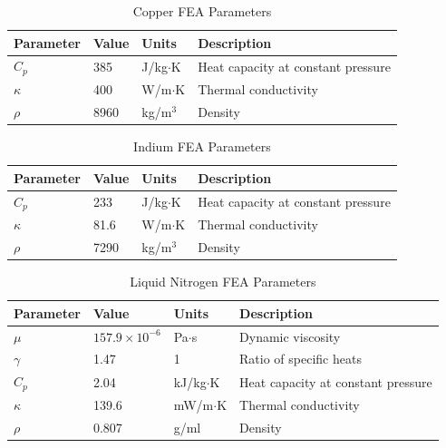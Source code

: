 \documentclass[preprint]{iucr}              %
\begin{document}
\begin{table}

\caption{Copper FEA Parameters}
\begin{tabular}{@{}llll@{}}
Parameter    & Value                  & Units                      & Description                        \\
\hline
$C_p$        & 385                    & J/kg$\cdot$K               & Heat capacity at constant pressure \\
$\kappa$     & 400                    & W/m$\cdot$K                & Thermal conductivity               \\ 
$\rho$       & 8960                   & kg/m$^3$                   & Density                            \\
\end{tabular}
\label{copperFEA}
\end{table}


\begin{table}
\caption{Indium FEA Parameters}
\begin{tabular}{@{}llll@{}}
Parameter    & Value                  & Units                      & Description                        \\
\hline
$C_p$        & 233                    & J/kg$\cdot$K               & Heat capacity at constant pressure \\
$\kappa$     & 81.6                   & W/m$\cdot$K                & Thermal conductivity               \\
$\rho$       & 7290                   & kg/m$^3$                   & Density                            \\
\end{tabular}
\label{indiumFEA}
\end{table}


\begin{table}
\caption{Liquid Nitrogen FEA Parameters}
\begin{tabular}{@{}llll@{}}
Parameter    & Value                  & Units                       & Description                        \\
\hline
$\mu$        & $157.9\times 10^{-6}$  & Pa$\cdot$s                  & Dynamic viscosity                  \\ 
$\gamma$     & 1.47                   & 1				            & Ratio of specific heats            \\
$C_p$        & 2.04                   & kJ/kg$\cdot$K               & Heat capacity at constant pressure \\
$\kappa$     & 139.6                  & mW/m$\cdot$K                & Thermal conductivity               \\
$\rho$       & 0.807                  & g/ml                        & Density                            \\
\end{tabular}
\label{nitogrenFEA}
\end{table}
\end{document}
